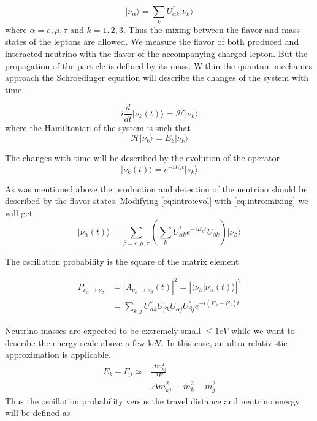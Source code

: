 \documentclass[../main.tex]{subfiles}
\begin{document}
\begin{equation}
\label{eq:intro:mixing}
\lvert\nu_\alpha\rangle = \sum_kU^*_{\alpha k}\lvert\nu_k\rangle
\end{equation}
where $\alpha = e, \mu, \tau$ and $k=1, 2, 3$. Thus the mixing between the flavor and mass states of the leptons are allowed. We measure the flavor of both produced and interacted neutrino with the flavor of the accompanying charged lepton. But the propagation of the particle is defined by its mass. Within the quantum mechanics approach the Schroedinger equation will describe the changes of the system with time.

\begin{equation}
i\frac{d}{dt}\lvert\nu_k(t)\rangle=\mathcal{H}\lvert\nu_k\rangle
\end{equation}
where the Hamiltonian of the system is such that
\begin{equation}
\label{eq:intro:ham}
\mathcal{H}\lvert\nu_k\rangle=E_k\lvert\nu_k\rangle
\end{equation}

The changes with time will be described by the evolution of the operator
\begin{equation}
\label{eq:intro:evol}
\lvert\nu_k(t)\rangle=e^{-iE_kt}\lvert\nu_k\rangle
\end{equation}

As was mentioned above the production and detection of the neutrino should be described by the flavor states. Modifying \autoref{eq:intro:evol} with \autoref{eq:intro:mixing} we will get
\begin{equation}
\lvert\nu_\alpha(t)\rangle=\sum_{\beta=e, \mu, \tau}\left(\sum_k U^*_{\alpha k}e^{-iE_kt}U_{\beta k} \right)\lvert\nu_\beta\rangle
\end{equation}

The oscillation probability is the square of the matrix element

\begin{align}
P_{\nu_\alpha\to\nu_\beta}&=\left|A_{\nu_\alpha\to\nu_\beta}(t)\right|^2=\left|\langle\nu_\beta\vert\nu_\alpha(t)\rangle\right|^2 \\ \nonumber
{}&=\sum_{k, j}U^*_{\alpha k}U_{\beta k}U_{\alpha j}U^*_{\beta j}e^{-i\left(E_k-E_j\right)t}
\end{align}

Neutrino masses are expected to be extremely small $\leqslant 1eV$ while we want to describe the energy scale above a few keV. In this case, an ultra-relativistic approximation is applicable.
\begin{align}
E_k-E_j \simeq&\frac{\Delta m_{kj}^2}{2E} \\
&\Delta m_{kj}^2 \equiv m^2_k-m^2_j \nonumber
\end{align}
Thus the oscillation probability versus the travel distance and neutrino energy will be defined as
\end{document}
